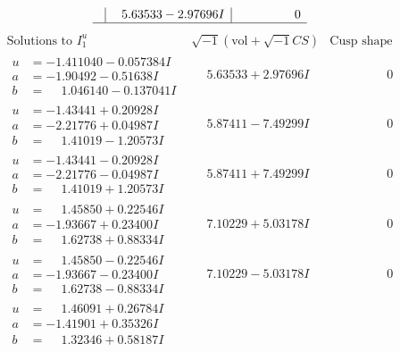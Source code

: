 \documentclass[1p]{elsarticle_modified}
\theoremstyle{definition}
\newcommand{\I}{\sqrt{-1}}
\begin{document}
$$\begin{array}{c|c|c}
 & \phantom{-}5.63533 - 2.97696 I & \phantom{-0.000000 } 0\\
 \hline 
 \end{array}$$\newpage$$\begin{array}{c|c|c}  
\text{Solutions to }I^u_{1}& \I (\text{vol} + \sqrt{-1}CS) & \text{Cusp shape}\\
 \hline 
\begin{aligned}
u &= -1.411040 - 0.057384 I \\
a &= -1.90492 - 0.51638 I \\
b &= \phantom{-}1.046140 - 0.137041 I\end{aligned}
 & \phantom{-}5.63533 + 2.97696 I & \phantom{-0.000000 } 0 \\ \hline\begin{aligned}
u &= -1.43441 + 0.20928 I \\
a &= -2.21776 + 0.04987 I \\
b &= \phantom{-}1.41019 - 1.20573 I\end{aligned}
 & \phantom{-}5.87411 - 7.49299 I & \phantom{-0.000000 } 0 \\ \hline\begin{aligned}
u &= -1.43441 - 0.20928 I \\
a &= -2.21776 - 0.04987 I \\
b &= \phantom{-}1.41019 + 1.20573 I\end{aligned}
 & \phantom{-}5.87411 + 7.49299 I & \phantom{-0.000000 } 0 \\ \hline\begin{aligned}
u &= \phantom{-}1.45850 + 0.22546 I \\
a &= -1.93667 + 0.23400 I \\
b &= \phantom{-}1.62738 + 0.88334 I\end{aligned}
 & \phantom{-}7.10229 + 5.03178 I & \phantom{-0.000000 } 0 \\ \hline\begin{aligned}
u &= \phantom{-}1.45850 - 0.22546 I \\
a &= -1.93667 - 0.23400 I \\
b &= \phantom{-}1.62738 - 0.88334 I\end{aligned}
 & \phantom{-}7.10229 - 5.03178 I & \phantom{-0.000000 } 0 \\ \hline\begin{aligned}
u &= \phantom{-}1.46091 + 0.26784 I \\
a &= -1.41901 + 0.35326 I \\
b &= \phantom{-}1.32346 + 0.58187 I\end{aligned}

\end{array}$$
\end{document}
